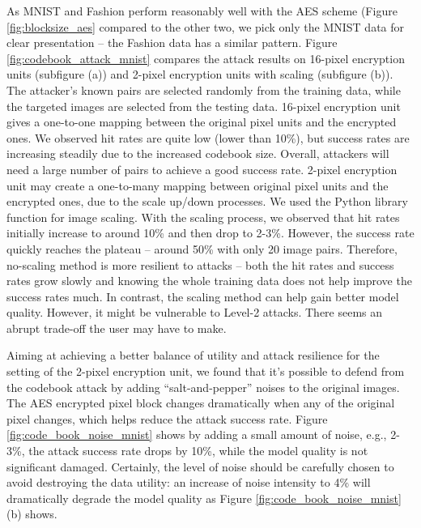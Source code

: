 \documentclass[conference]{IEEEtran}
\begin{document}
As MNIST and Fashion perform reasonably well with the AES scheme (Figure \ref{fig:blocksize_aes} compared to the other two, we pick only the MNIST data for clear presentation -- the Fashion data has a similar pattern. Figure \ref{fig:codebook_attack_mnist} compares the attack results on 16-pixel encryption units (subfigure (a)) and 2-pixel encryption units with scaling (subfigure (b)). The attacker's known pairs are selected randomly from the training data, while the targeted images are selected from the testing data. 16-pixel encryption unit gives a one-to-one mapping between the original pixel units and the encrypted ones. We observed hit rates are quite low (lower than 10\%), but success rates are increasing steadily due to the increased codebook size. Overall, attackers will need a large number of pairs to achieve a good success rate. 2-pixel encryption unit may create a one-to-many mapping between original pixel units and the encrypted ones, due to the scale up/down processes. We used the Python library function for image scaling. With the scaling process, we observed that hit rates initially increase to around 10\% and then drop to 2-3\%. However, the success rate quickly reaches the plateau -- around 50\% with only 20 image pairs. Therefore, no-scaling method is more resilient to attacks -- both the hit rates and success rates grow slowly and knowing the whole training data does not help improve the success rates much. In contrast, the scaling method can help gain better model quality. However, it might be vulnerable to Level-2 attacks.  There seems an abrupt trade-off the user may have to make. 

Aiming at achieving a better balance of utility and attack resilience for the setting of the 2-pixel encryption unit, we found that it's possible to defend from the codebook attack by adding ``salt-and-pepper'' noises to the original images. The AES encrypted pixel block changes dramatically when any of the original pixel changes, which helps reduce the attack success rate. Figure \ref{fig:code_book_noise_mnist} shows by adding a small amount of noise, e.g., 2-3\%, the attack success rate drops by 10\%, while the model quality is not significant damaged. Certainly, the level of noise should be carefully chosen to avoid destroying the data utility: an increase of noise intensity to 4\% will dramatically degrade the model quality as Figure \ref{fig:code_book_noise_mnist} (b) shows. 
\end{document}
